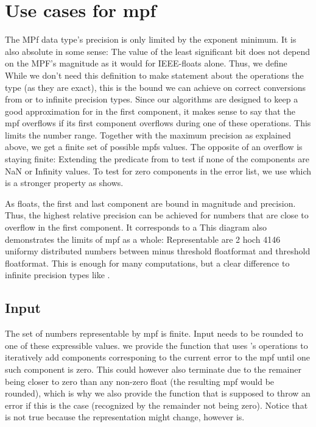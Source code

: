 \documentclass[11pt,a4paper]{article}
\begin{document}
\section{Use cases for mpf}
The MPf data type's precision is only limited by the exponent minimum. It is also absolute in some sense: The value of the least significant bit
does not depend on the MPF's magnitude as it would for IEEE-floats alone.
Thus, we define
While we don't need this definition to make statement about the operations
the \typmpf type (as they are exact), this is the bound we can achieve on correct conversions from or to infinite precision types.
Since our algorithms are designed to keep a good approximation for
in the first component, it makes sense to say that the mpf overflows if its first component overflows during one of these operations. This limits the number range. Together with the maximum precision as explained above, we get a finite set of possible mpfs values.
The opposite of an overflow is staying finite: Extending the
predicate from
to test if none of the components are NaN or Infinity values. To test for zero components in the error list, we use
which is a stronger property as
shows.


As floats, the first and last component are bound in magnitude and precision. Thus, the highest relative precision can be achieved for numbers that are close to overflow in the first component. It corresponds to a 
This diagram also demonstrates the limits of mpf as a whole: Representable are 2 hoch 4146 uniformy distributed numbers between minus threshold floatformat and threshold floatformat. This is enough for many computations, but a clear difference to infinite precision types like
.


\subsection{Input}
The set of numbers representable by mpf is finite.
Input needs to be rounded to one of these expressible values. we provide the
function that uses
's operations to iteratively add components corresponing to the current error to the mpf until one such component is zero. This could however also terminate due to the remainer being closer to zero than any non-zero float (the resulting mpf would be rounded), which is why we also provide the
function that is supposed to throw an error if this is the case (recognized by the remainder not being zero).
Notice that
is not true because the representation might change,
however
is.
\end{document}
